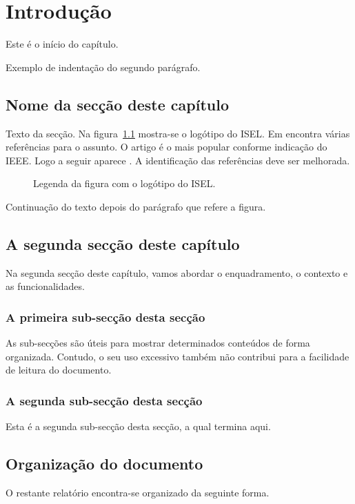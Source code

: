 %
%
\chapter{Introdução} \label{cap:intro}

Este é o início do capítulo.

Exemplo de indentação do segundo parágrafo.

%
%
\section{Nome da secção deste capítulo} \label{sec11}

Texto da secção. Na figura~\ref{fig:logotipo} mostra-se o logótipo do ISEL. Em \cite{wiki:bigdata2019} encontra várias referências para o assunto. O artigo \cite{6547630} é o mais popular conforme indicação do IEEE. Logo a seguir aparece \cite{6824752}. A identificação das referências deve ser melhorada.

\begin{figure}[h]
\begin{center}
\end{center}
\caption{Legenda da figura com o logótipo do ISEL.}\label{fig:logotipo}
\end{figure}

Continuação do texto depois do parágrafo que refere a figura.


%
%
\section{A segunda secção deste capítulo} \label{sec12}
Na segunda secção deste capítulo, vamos abordar o enquadramento,
o contexto e as funcionalidades.

%
%
\subsection{A primeira sub-secção desta secção} \label{sec121}
As sub-secções são úteis para mostrar determinados conteúdos de forma
organizada. Contudo, o seu uso excessivo também não contribui para a facilidade
de leitura do documento.

%
%
\subsection{A segunda sub-secção desta secção} \label{sec122}
Esta é a segunda sub-secção desta secção, a qual termina aqui.


%
%
\section{Organização do documento} \label{sec13}
O restante relatório encontra-se organizado da seguinte forma.